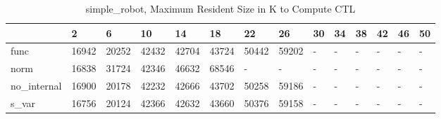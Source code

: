 \begin{table}
\caption{simple_robot, Maximum Resident Size in K to Compute CTL}
\label{simple_robot_CTL_size}
\begin{tabular}{llllllllllllll}
\toprule
 & 2 & 6 & 10 & 14 & 18 & 22 & 26 & 30 & 34 & 38 & 42 & 46 & 50 \\
\midrule
func & 16942 & 20252 & 42432 & 42704 & 43724 & 50442 & 59202 & - & - & - & - & - & - \\
norm & 16838 & 31724 & 42346 & 46632 & 68546 & - & - & - & - & - & - & - & - \\
no_internal & 16900 & 20178 & 42232 & 42666 & 43702 & 50258 & 59186 & - & - & - & - & - & - \\
s_var & 16756 & 20124 & 42366 & 42632 & 43660 & 50376 & 59158 & - & - & - & - & - & - \\
\bottomrule
\end{tabular}
\end{table}
